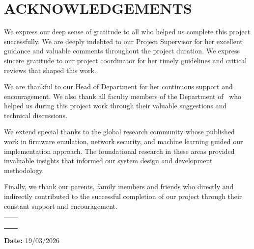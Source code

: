\chapter*{ACKNOWLEDGEMENTS}


	We express our deep sense of gratitude to all who helped us complete this project successfully. We are deeply indebted to our Project Supervisor \textbf{\theprojectguide} for her excellent guidance and valuable comments throughout the project duration. We express sincere gratitude to our project coordinator \textbf{\theProjectcoordinator} for her timely guidelines and critical reviews that shaped this work.
	
	We are thankful to our Head of Department \textbf{\thehod} for her continuous support and encouragement. We also thank all faculty members of the Department of \thedepartment\ who helped us during this project work through their valuable suggestions and technical discussions.
	
	We extend special thanks to the global research community whose published work in firmware emulation, network security, and machine learning guided our implementation approach. The foundational research in these areas provided invaluable insights that informed our system design and development methodology.
	
	Finally, we thank our parents, family members and friends who directly and indirectly contributed to the successful completion of our project through their constant support and encouragement.
	
	\vspace{1cm}
	
	\begin{tabular}{ll}
		\textbf{\studentA} & \regA \\
		\textbf{\studentB} & \regB \\
		\textbf{\studentC} & \regC \\
		\textbf{\studentD} & \regD \\
	\end{tabular}
	
	\vspace{0.5cm}
	
	\noindent\textbf{Date:} 19/03/2026
	
